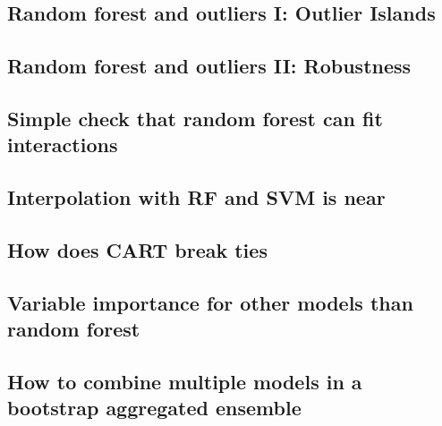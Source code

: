 \subsection{Random forest and outliers I: Outlier Islands}

\label{CV2_fullygrown}

\subsection{Random forest and outliers II: Robustness}

\label{CV3_sensitiveOutliers}

\subsection{Simple check that random forest can fit interactions}

\label{CV4_assertInteraction}

\subsection{Interpolation with RF and SVM is near}

\label{CV5_SVM_RF_same_same}

\subsection{How does CART break ties}

\label{CV6_CARTtiebreak}

\subsection{Variable importance for other models than random forest}

\label{CV7_VIbeyondRF}

\subsection{How to combine multiple models in a bootstrap aggregated ensemble}

\label{CV8_combineBagging}

